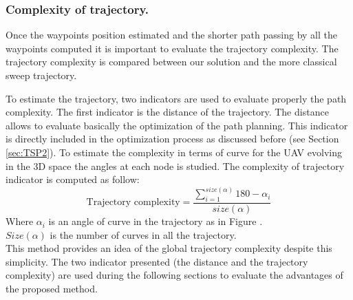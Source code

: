  
\subsubsection*{Complexity of trajectory. }\label{tarjectory}

Once the waypoints position estimated and the shorter path passing by all the waypoints computed it is important to evaluate the trajectory complexity. %
The trajectory complexity is compared between our solution and the more classical sweep trajectory.
 
To estimate the trajectory, two indicators are used to evaluate properly the path complexity. The first indicator is the distance of the trajectory. The distance allows to evaluate basically the optimization of the path planning. This indicator is directly included in the optimization process as discussed before (see Section \ref{sec:TSP2}). 
To estimate the complexity in terms of curve for the UAV evolving in the 3D space the angles at each node is studied. 
The complexity of trajectory indicator is computed as follow: 
\begin{equation}\label{Eq:trajectory}
\mbox{Trajectory complexity}=\frac{ \sum_{i=1}^{size(\alpha)} 180- \alpha_{i}  }{size(\alpha)}   
\end{equation}
Where $\alpha_i$ is an angle of curve in the trajectory as in Figure . \\
$Size(\alpha)$ is the number of curves in all the trajectory.\\ 
This method provides an idea of the global trajectory complexity despite this simplicity. 
The two indicator presented (the distance and the trajectory complexity) are used during the following sections to evaluate the advantages of the proposed method.
	
